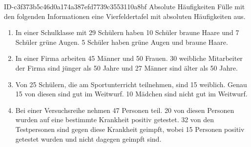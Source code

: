 \begin{exercise}
      {ID-c3f373b5c46d0a174a387efd7739c3553110a8bf}
      {Absolute Häufigkeiten}
  \ifproblem\problem
    Fülle mit den folgenden Informationen eine Vierfeldertafel mit
    absoluten Häufigkeiten aus.
    \begin{enumerate}
      \item In einer Schulklasse mit 29 Schülern haben 10 Schüler braune Haare
            und 7 Schüler grüne Augen. 5 Schüler haben grüne Augen und braune Haare.
      \item In einer Firma arbeiten 45 Männer und 50 Frauen. 30 weibliche Mitarbeiter
            der Firma sind jünger als 50 Jahre und 27 Männer sind älter als 50 Jahre.
      \item Von 25 Schülern, die am Sportunterricht teilnehmen, sind 15 weiblich.
            Genau 15 von diesen sind gut im Weitwurf.
            10 Mädchen sind nicht gut im Weitwurf.
      \item Bei einer Versuchsreihe nehmen 47 Personen teil. 20 von diesen Personen
            wurden auf eine bestimmte Krankheit positiv getestet. 32 von den
            Testpersonen sind gegen diese Krankheit geimpft, wobei 15 Personen
            positiv getestet wurden und nicht dagegen geimpft sind.
    \end{enumerate}
  \fi
\end{exercise}
